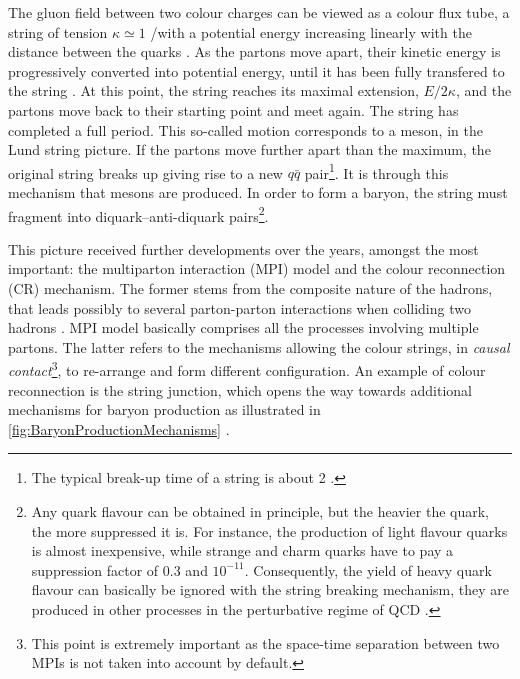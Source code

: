 The gluon field between two colour charges can be viewed as a colour flux tube, a string of tension $\kappa \simeq 1$ \gev/\fm with a potential energy increasing linearly with the distance between the quarks \cite{bierlichComprehensiveGuidePhysics2022}. As the partons move apart, their kinetic energy is progressively converted into potential energy, until it has been fully transfered to the string . At this point, the string reaches its maximal extension, $E/2\kappa$, and the partons move back to their starting point and meet again. The string has completed a full period. This so-called  motion corresponds to a meson, in the Lund string picture. If the partons move further apart than the maximum, the original string breaks up giving rise to a new $q \bar{q}$ pair\footnote{The typical break-up time of a string is about 2 \fmC \cite{bierlichComprehensiveGuidePhysics2022}.}. It is through this mechanism that mesons are produced. In order to form a baryon, the string must fragment into diquark--anti-diquark pairs\footnote{Any quark flavour can be obtained in principle, but the heavier the quark, the more suppressed it is. For instance, the production of light flavour quarks is almost inexpensive, while strange and charm quarks have to pay a suppression factor of $0.3$ and $10^{-11}$. Consequently, the yield of heavy quark flavour can basically be ignored with the string breaking mechanism, they are produced in other processes in the perturbative regime of QCD \cite{sjostrandIntroductionPYTHIA2015}.}. 

This picture received further developments over the years, amongst the most important: the multiparton interaction (MPI) model and the colour reconnection (CR) mechanism. The former stems from the composite nature of the hadrons, that leads possibly to several parton-parton interactions when colliding two hadrons \cite{sjostrandDevelopmentMPIModelling2017}. MPI model basically comprises all the processes involving multiple partons. The latter refers to the mechanisms allowing the colour strings, in \textit{causal contact}\footnote{This point is extremely important as the space-time separation between two MPIs is not taken into account by default.}, to re-arrange and form different configuration. An example of colour reconnection is the string junction, which opens the way towards additional mechanisms for baryon production as illustrated in \fig\ref{fig:BaryonProductionMechanisms} \cite{heleniusRecentPythiaDevelopments2016}.\\

